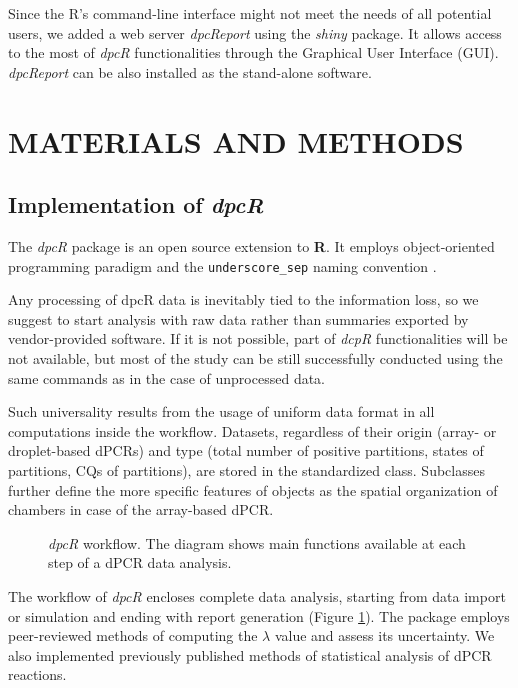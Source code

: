 \documentclass[a4,center,fleqn]{NAR}
\begin{document}
Since the R's command-line interface might not meet the needs of all potential 
users, we added a web server \textit{dpcReport} using the \textit{shiny} 
package. It allows access to the most of \textit{dpcR} functionalities through 
the Graphical User Interface (GUI). \textit{dpcReport} can be also installed as 
the stand-alone software.

\section{MATERIALS AND METHODS}

\subsection{Implementation of \textit{dpcR}}

The \textit{dpcR} package is an open source extension to \textbf{R}. It 
employs object-oriented programming paradigm and the \texttt{underscore\_sep} 
naming convention \cite{Baaaath_2012}.

Any processing of dpcR data is inevitably tied to the information loss, so we 
suggest to start analysis with raw data rather than summaries exported by 
vendor-provided software. If it is not possible, part of \textit{dcpR} 
functionalities will be not available, but most of the study can be still 
successfully conducted using the same commands as in the case of unprocessed 
data. 

Such universality results from the usage of uniform data format in all 
computations inside the workflow. Datasets, regardless of their origin (array- 
or droplet-based dPCRs) and type (total number of positive partitions, states of 
partitions, CQs of partitions), are stored in the standardized class. Subclasses 
further define the more specific features of objects as the spatial organization 
of chambers in case of the array-based dPCR.

\begin{figure}[t]
\begin{center}
\end{center}
\caption{\textit{dpcR} workflow. The diagram shows main functions 
available at each step of a dPCR data analysis.}
\label{workflow}
\end{figure}

The workflow of \textit{dpcR} encloses complete data analysis, starting from 
data import or simulation and ending with report generation (Figure 
\ref{workflow}). The package employs peer-reviewed methods of computing the 
$\lambda$ value and assess its uncertainty. We also implemented previously 
published methods of statistical analysis of dPCR reactions.
\end{document}
